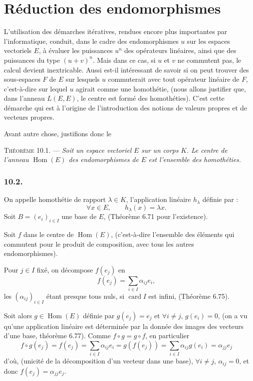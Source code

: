 \chapter{Réduction des endomorphismes}

L'utilisation des démarches itératives, rendues encore plus importantes par l'informatique, conduit, dans le cadre des endomorphismes $u$ sur les espaces vectoriels $E$, à évaluer les puissances $u^n$ des opérateurs linéaires, ainsi que des puissances du type $(u+v)^n$. Mais dans ce cas, si $u$ et $v$ ne commutent pas, le calcul devient inextricable. Aussi est-il intéressant de savoir si on peut trouver des sous-espaces $F$ de $E$ sur lesquels $u$ commuterait avec tout opérateur linéaire de $F$, c'est-à-dire sur lequel $u$ agirait comme une homothétie, (nous allons justifier que, dans l'anneau $L(E,E)$, le centre est formé des homothéties). C'est cette démarche qui est à l'origine de l'introduction des notions de valeurs propres et de vecteurs propres.

Avant autre chose, justifions donc le

\medskip\noindent\textsc{Théorème 10.1.} --- \emph{Soit un espace vectoriel $E$ sur un corps $K$. Le centre de l'anneau $\operatorname{Hom}(E)$ des endomorphismes de $E$ est l'ensemble des homothéties.}

\subsection*{10.2.}
On appelle homothétie de rapport $\lambda\in K$, l'application linéaire $h_\lambda$ définie par :
\[
\forall x\in E,\qquad h_\lambda(x)=\lambda x.
\]
Soit $B=(e_i)_{i\in I}$ une base de $E$, (Théorème 6.71 pour l'existence).

Soit $f$ dans le centre de $\operatorname{Hom}(E)$, (c'est-à-dire l'ensemble des éléments qui commutent pour le produit de composition, avec tous les autres endomorphismes).

Pour $j\in I$ fixé, on décompose $f(e_j)$ en
\[
f(e_j)=\sum_{i\in I}\alpha_{ij}e_i,
\]
les $(\alpha_{ij})_{i\in I}$ étant presque tous nuls, si $\operatorname{card}I$ est infini, (Théorème 6.75).

Soit alors $g\in\operatorname{Hom}(E)$ définie par $g(e_j)=e_j$ et $\forall i\ne j$, $g(e_i)=0$, (on a vu qu'une application linéaire est déterminée par la donnée des images des vecteurs d'une base, théorème 6.77). Comme $f\circ g=g\circ f$, en particulier
\[
f\circ g(e_j)=f(e_j)=\sum_{i\in I}\alpha_{ij}e_i
=g(f(e_j))=\sum_{i\in I}\alpha_{ij}g(e_i)=\alpha_{jj}e_j
\]
d'où, (unicité de la décomposition d'un vecteur dans une base), $\forall i\ne j$, $\alpha_{ij}=0$, et donc $f(e_j)=\alpha_{jj}e_j$.

